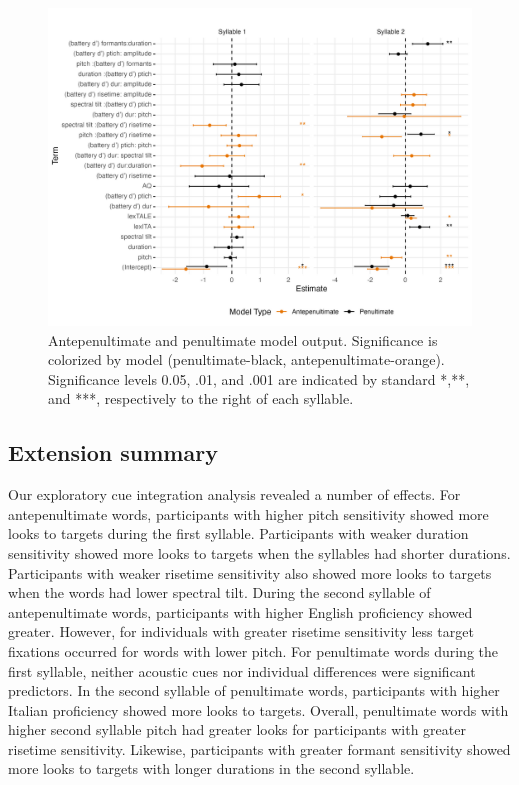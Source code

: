 \begin{figure}[H]
  \centering
  \includegraphics[width=1\linewidth]{visuals/extended_analysis.jpeg} %
  \caption{Antepenultimate and penultimate model output. Significance is colorized by model (penultimate-black, antepenultimate-orange). Significance levels 0.05, .01, and .001 are indicated by standard *,**, and ***, respectively to the right of each syllable.}
  \label{fig:extened_analysis}
\end{figure}


\subsection{Extension summary}

Our exploratory cue integration analysis revealed a number of effects. For antepenultimate words, participants with higher pitch sensitivity showed more looks to targets during the first syllable. Participants with weaker duration sensitivity showed more looks to targets when the syllables had shorter durations. Participants with weaker risetime sensitivity also showed more looks to targets when the words had lower spectral tilt. During the second syllable of antepenultimate words, participants with higher English proficiency showed greater. However, for individuals with greater risetime sensitivity less target fixations occurred for words with lower pitch. For penultimate words during the first syllable, neither acoustic cues nor individual differences were significant predictors. In the second syllable of penultimate words, participants with higher Italian proficiency showed more looks to targets. Overall, penultimate words with higher second syllable pitch had greater looks for participants with greater risetime sensitivity. Likewise, participants with greater formant sensitivity showed more looks to targets with longer durations in the second syllable. 